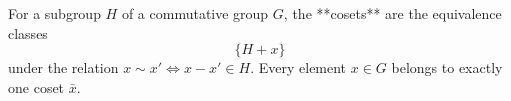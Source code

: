 For a subgroup $H$ of a commutative group $G$, the **cosets** are the equivalence classes
$$\{H + x\}$$
under the relation $x \sim x' \iff x - x' \in H$. Every element $x \in G$ belongs to exactly one coset $\bar{x}$.
